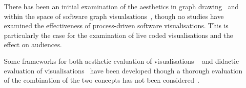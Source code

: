 There has been an initial examination of the aesthetics in graph drawing~ and within the space of software graph visualsations~, though no studies have examined the effectiveness of process-driven software visualisations. This is particularly the case for the examination of live coded visualisations and the effect on audiences.

Some frameworks for both aesthetic evaluation of visualisations
~ and didactic evaluation of visualisations~ have been developed though a thorough evaluation of the combination of the two concepts has not been considered~.

